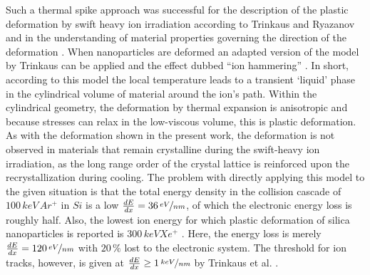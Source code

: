 Such a thermal spike approach was successful for the description of the plastic deformation by swift heavy ion irradiation according to Trinkaus and Ryazanov \cite{trinkaus_viscoelastic_1995} and in the understanding of material properties governing the direction of the deformation \cite{hedler_amorphous_2004,hedler_boundary_2005}. When nanoparticles are deformed \cite{snoeks_colloidal_2000,snoeks_colloidal_2001,van_dillen_anisotropic_2001,dillen_energy-dependent_2001,dillen_ion_2003,dillen_ion_2004} an adapted version of the model by Trinkaus can be applied and the effect dubbed ``ion hammering'' \cite{klaumunzer_ion_2004}. In short, according to this model the local temperature leads to a transient `liquid' phase in the cylindrical volume of material around the ion's path. Within the cylindrical geometry, the deformation by thermal expansion is anisotropic and because stresses can relax in the low-viscous volume, this is plastic deformation. As with the deformation shown in the present work, the deformation is not observed in materials that remain crystalline during the swift-heavy ion irradiation, as the long range order of the crystal lattice is reinforced upon the recrystallization during cooling. The problem with directly applying this model to the given situation is that the total energy density in the collision cascade of $100\,keV\,Ar^+$ in $Si$ is a low $\frac{dE}{dx} = 36\,\nicefrac{eV}{nm}$, of which the electronic energy loss is roughly half. Also, the lowest ion energy for which plastic deformation of silica nanoparticles is reported is $300\,keV Xe^+$ \cite{dillen_ion_2003}. Here, the energy loss is merely $\frac{dE}{dx} = 120\,\nicefrac{eV}{nm}$ with $20\,\%$ lost to the electronic system. The threshold for ion tracks, however, is given at $\frac{dE}{dx} \geq 1\,\nicefrac{keV}{nm}$ by Trinkaus et al. \cite{trinkaus_viscoelastic_1995}.

